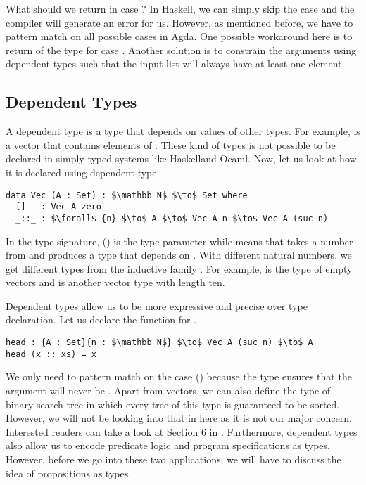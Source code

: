 \par What should we return in case \mb{[\ ]}? In Haskell, we can
simply skip the \mb{[\ ]} case and the compiler will generate an error
for us. However, as mentioned
before, we have to pattern match on all possible cases in Agda. One
possible workaround here is to return  of the  type
for case \mb{[\ ]}. Another solution is
to constrain the arguments using dependent types such that the input list will always have at least one element. 


\subsection{Dependent Types}
\par A dependent type is a type that depends on values of other
types. For example,  is a vector that contains  elements
of . These kind of types is not possible
to be declared in simply-typed systems like Haskell\footnotemark and Ocaml. Now, let
us look at how it is declared using dependent type. 
\begin{lstlisting}[mathescape=true,xleftmargin=.3\textwidth]
data Vec (A : Set) : $\mathbb N$ $\to$ Set where
  []   : Vec A zero
  _::_ : $\forall$ {n} $\to$ A $\to$ Vec A n $\to$ Vec A (suc n)
\end{lstlisting} 

\par In the type signature, () is the type
parameter while  means
that  takes a number  from  and produces a
type that depends on . With different natural numbers, we get
different types from the inductive family . For example,  is
the type of empty vectors and  is another vector type with length ten. 

\par Dependent types allow us to be more
expressive and precise over type declaration. Let us declare the
 function for . 
\begin{lstlisting}[mathescape=true,xleftmargin=.3\textwidth]
head : {A : Set}{n : $\mathbb N$} $\to$ Vec A (suc n) $\to$ A
head (x :: xs) = x 
\end{lstlisting} 

\par We only need to pattern match on the case () because the type  ensures that the argument will never
be \mb{[\ ]}. Apart from vectors, we can also define the type of binary
search tree in which every tree of this type is guaranteed to be
sorted. However, we will not be looking into that in here as it
is not our major concern. Interested readers can take a look at 
Section 6 in \cite{bove2009}. Furthermore, dependent types also allow
us to encode predicate logic and program specifications as
types. However, before we go into these two applications, we will have
to discuss the idea of propositions as types. 


